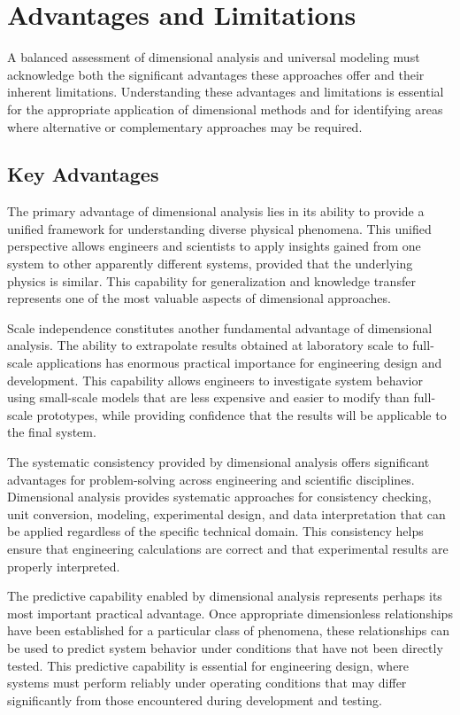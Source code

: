 \documentclass[
	11pt, %
	fleqn, %
	a4paper, %
]{LegrandOrangeBook}
\begin{document}
\section{Advantages and Limitations}

A balanced assessment of dimensional analysis and universal modeling must acknowledge both the significant advantages these approaches offer and their inherent limitations. Understanding these advantages and limitations is essential for the appropriate application of dimensional methods and for identifying areas where alternative or complementary approaches may be required.

\subsection{Key Advantages}

The primary advantage of dimensional analysis lies in its ability to provide a unified framework for understanding diverse physical phenomena. This unified perspective allows engineers and scientists to apply insights gained from one system to other apparently different systems, provided that the underlying physics is similar. This capability for generalization and knowledge transfer represents one of the most valuable aspects of dimensional approaches.

Scale independence constitutes another fundamental advantage of dimensional analysis. The ability to extrapolate results obtained at laboratory scale to full-scale applications has enormous practical importance for engineering design and development. This capability allows engineers to investigate system behavior using small-scale models that are less expensive and easier to modify than full-scale prototypes, while providing confidence that the results will be applicable to the final system.

The systematic consistency provided by dimensional analysis offers significant advantages for problem-solving across engineering and scientific disciplines. Dimensional analysis provides systematic approaches for consistency checking, unit conversion, modeling, experimental design, and data interpretation that can be applied regardless of the specific technical domain. This consistency helps ensure that engineering calculations are correct and that experimental results are properly interpreted.

The predictive capability enabled by dimensional analysis represents perhaps its most important practical advantage. Once appropriate dimensionless relationships have been established for a particular class of phenomena, these relationships can be used to predict system behavior under conditions that have not been directly tested. This predictive capability is essential for engineering design, where systems must perform reliably under operating conditions that may differ significantly from those encountered during development and testing.
\end{document}
